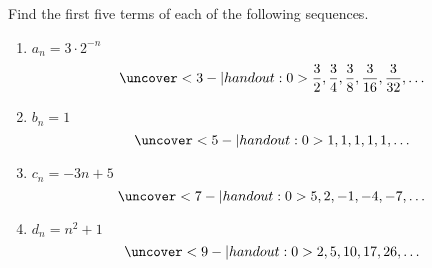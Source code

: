\begin{frame}
\begin{example}
Find the first five terms of each of the following sequences.  
\begin{enumerate}
\item<alert@2-3| handout:alert@0>  $a_n = 3\cdot 2^{-n}$
\[
\uncover<3-| handout:0>{%
\frac{3}{2},\frac{3}{4},\frac{3}{8},\frac{3}{16},\frac{3}{32},\ldots
}%
\]
\item<alert@4-5| handout:alert@0>  $b_n = 1$
\[
\uncover<5-| handout:0>{%
1,1,1,1,1,\ldots
}%
\]
\item<alert@6-7| handout:alert@0>  $c_n = -3n+5$
\[
\uncover<7-| handout:0>{%
5,2,-1,-4,-7,\ldots
}%
\]
\item<alert@8-9| handout:alert@0>  $d_n = n^2+1$
\[
\uncover<9-| handout:0>{%
2,5,10,17,26,\ldots
}%
\]
\end{enumerate}
\end{example}

\end{frame}
